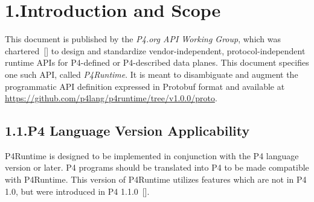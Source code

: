 \documentclass[11pt]{article}
\begin{document}
{\begin{mdtoc}
\begin{mdtocblock}


\end{mdtocblock}%
\end{mdtoc}%

\section{1.\hspace*{0.5em}Introduction and Scope}\label{sec-introduction-and-scope}%

\noindent{}This document is published by the \emph{P4.org API Working Group}, which was
chartered~[] to design and standardize vendor-independent,
protocol-independent runtime APIs for P4-defined or P4-described data
planes. This document specifies one such API, called \emph{P4Runtime}. It is meant to
disambiguate and augment the programmatic API definition expressed in Protobuf
format and available at
\href{https://github.com/p4lang/p4runtime/tree/v1.0.0/proto}{https://github.com/p4lang/p4runtime/tree/v1.0.0/proto}.%

\subsection{1.1.\hspace*{0.5em}P4 Language Version Applicability}\label{sec-p4-language-version-applicability}%

\noindent{}P4Runtime is designed to be implemented in conjunction with the P4 language
version or later. P4 programs should be translated into P4 to be made
compatible with P4Runtime. This version of P4Runtime utilizes features which are
not in P4 1.0, but were introduced in P4 1.1.0~[].%

}
\end{document}
